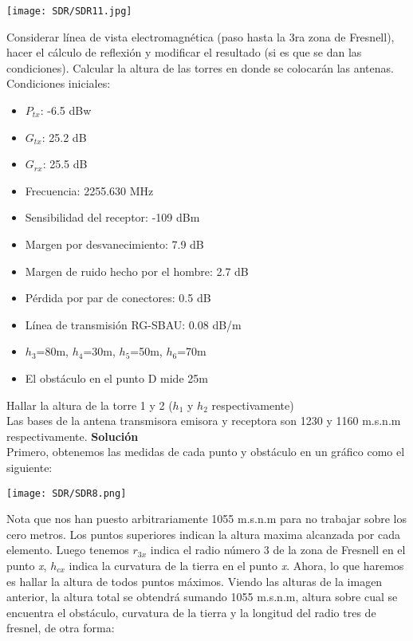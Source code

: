 \documentclass[
	12pt, %
	fleqn, %
	a4paper, %
	oneside, %
]{LegrandOrangeBook}
\begin{document}
\begin{example}
\begin{center}
\texttt{[image: SDR/SDR11.jpg]}
\end{center}
Considerar línea de vista electromagnética (paso hasta la 3ra zona de Fresnell), hacer el cálculo de reflexión y modificar el resultado (si es que se dan las condiciones). Calcular la altura de las torres en donde 	se colocarán las antenas.\\
Condiciones iniciales:
\begin{itemize}
\item $P_{tx}$: -6.5 dBw
\item $G_{tx}$: 25.2 dB
\item $G_{rx}$: 25.5 dB
\item Frecuencia: 2255.630 MHz
\item Sensibilidad del receptor: -109 dBm
\item Margen por desvanecimiento: 7.9 dB
\item Margen de ruido hecho por el hombre: 2.7 dB
\item Pérdida por par de conectores: 0.5 dB
\item Línea de transmisión RG-SBAU: 0.08 dB/m
\item $h_3$=80m, $h_4$=30m, $h_5$=50m, $h_6$=70m
\item El obstáculo en el punto D mide 25m
\end{itemize}
Hallar la altura de la torre 1 y 2 ($h_1$ y $h_2$ respectivamente)\\
Las bases de la antena transmisora emisora y receptora son 1230 y 1160 m.s.n.m respectivamente.
\textbf{Solución}\\
Primero, obtenemos las medidas de cada punto y obstáculo en un gráfico como el siguiente:
\begin{center}
\texttt{[image: SDR/SDR8.png]}
\end{center}
Nota que nos han puesto arbitrariamente 1055 m.s.n.m para no trabajar sobre los cero metros.
Los puntos superiores indican la altura maxima alcanzada por cada elemento. Luego tenemos $r_{3x}$ indica el radio número 3 de la zona de Fresnell en el punto \textit{x}, $h_{cx}$ indica la curvatura de la tierra en el punto \textit{x}.
Ahora, lo que haremos es hallar la altura de todos puntos máximos. Viendo las alturas de la imagen anterior, la altura total se obtendrá sumando 1055 m.s.n.m, altura sobre cual se encuentra el obstáculo, curvatura de la tierra y la longitud del radio tres de fresnel, de otra forma:

\end{example}
\end{document}
